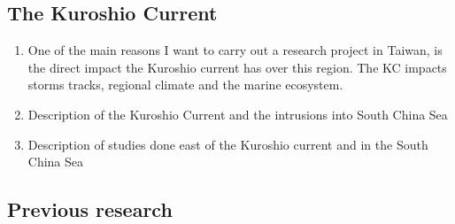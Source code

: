 \documentclass[letterpaper, 12pt ]{article}
\begin{document}
\subsection*{The Kuroshio Current}
\begin{enumerate}
    \item  One of the main reasons I want to carry out a research project in Taiwan, is the direct impact the Kuroshio current has over this region. The KC impacts storms tracks, regional climate and the marine ecosystem. 
    
    \item Description of the Kuroshio Current and the intrusions into South China Sea
    
    \item Description of studies done east of the Kuroshio current and in the South China Sea
    
    
    \end{enumerate}
    
    \subsection*{Previous research}  
    
\end{document}
